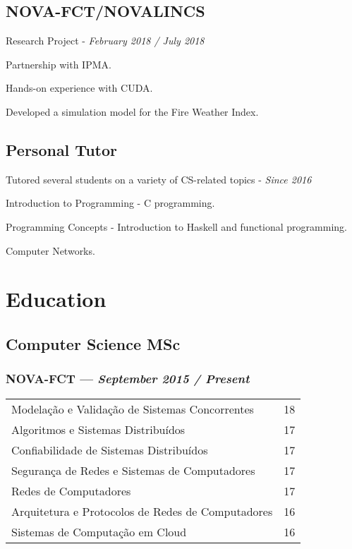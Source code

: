 \documentclass{article}
\begin{document}
\subsection*{NOVA-FCT/NOVALINCS}
Research Project - \emph{February 2018 / July 2018}
\begin{compactitem}
    \item Partnership with IPMA.
    \item Hands-on experience with CUDA.
    \item Developed a simulation model for the Fire Weather Index.
\end{compactitem}

\subsection*{Personal Tutor}
Tutored several students on a variety of CS-related topics - \emph{Since 2016}
\begin{compactitem}
    \item Introduction to Programming - C programming.
    \item Programming Concepts - Introduction to Haskell and functional programming.
    \item Computer Networks.
\end{compactitem}

\section*{Education}
\subsection*{Computer Science MSc}
\subsubsection*{NOVA-FCT --- \emph{September 2015 / Present}}

\begin{tabular}{l|r}
    Modelação e Validação de Sistemas Concorrentes    & 18 \\
    Algoritmos e Sistemas Distribuídos                & 17 \\
    Confiabilidade de Sistemas Distribuídos           & 17 \\
    Segurança de Redes e Sistemas de Computadores     & 17 \\
    Redes de Computadores                             & 17 \\
    Arquitetura e Protocolos de Redes de Computadores & 16 \\
    Sistemas de Computação em Cloud                   & 16 \\
\end{tabular}
\end{document}
